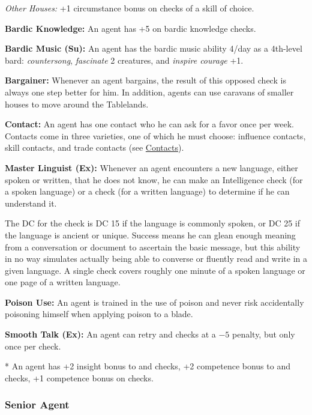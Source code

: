 \textit{Other Houses:} +1 circumstance bonus on checks of a skill of choice.

\textbf{Bardic Knowledge:} An agent has +5 on bardic knowledge checks.

\textbf{Bardic Music (Su):} An agent has the bardic music ability 4/day as a 4th-level bard: \emph{countersong}, \emph{fascinate} 2 creatures, and \emph{inspire courage} +1.

\textbf{Bargainer:} Whenever an agent bargains, the result of this  opposed check is always one step better for him. In addition, agents can use caravans of smaller houses to move around the Tablelands.

\textbf{Contact:} An agent has one contact who he can ask for a favor once per week. Contacts come in three varieties, one of which he must choose: influence contacts, skill contacts, and trade contacts (see \hyperref[sec:contacts]{Contacts}).

\textbf{Master Linguist (Ex):} Whenever an agent encounters a new language, either spoken or written, that he does not know, he can make an Intelligence check (for a spoken language) or a  check (for a written language) to determine if he can understand it.

The DC for the check is DC 15 if the language is commonly spoken, or DC 25 if the language is ancient or unique. Success means he can glean enough meaning from a conversation or document to ascertain the basic message, but this ability in no way simulates actually being able to converse or fluently read and write in a given language. A single check covers roughly one minute of a spoken language or one page of a written language.

\textbf{Poison Use:} An agent is trained in the use of poison and never risk accidentally poisoning himself when applying poison to a blade.

\textbf{Smooth Talk (Ex):} An agent can retry  and  checks at a $-5$ penalty, but only once per check.

* An agent has +2 insight bonus to  and  checks, +2 competence bonus to  and  checks, +1 competence bonus on  checks.

\subsubsection{Senior Agent}


